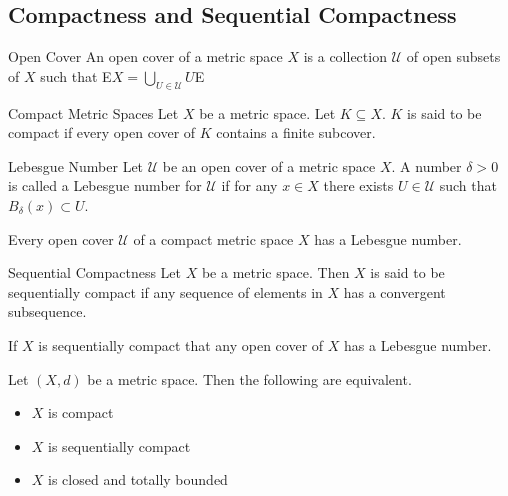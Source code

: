 \documentclass[a4paper]{article}
\begin{document}
\subsection{Compactness and Sequential Compactness}
\begin{defn}{Open Cover}{} An open cover of a metric space $X$ is a collection $\mathcal{U}$ of open subsets of $X$ such that E$X=\bigcup_{U\in\mathcal{U}}U$E
\end{defn}

\begin{defn}{Compact Metric Spaces}{} Let $X$ be a metric space. Let $K\subseteq X$. $K$ is said to be compact if every open cover of $K$ contains a finite subcover. 
\end{defn}

\begin{defn}{Lebesgue Number}{} Let $\mathcal{U}$ be an open cover of a metric space $X$. A number $\delta>0$ is called a Lebesgue number for $\mathcal{U}$ if for any $x\in X$ there exists $U\in\mathcal{U}$ such that $B_\delta(x)\subset U$. 
\end{defn}

\begin{lmm}{}{} Every open cover $\mathcal{U}$ of a compact metric space $X$ has a Lebesgue number. 
\end{lmm}

\begin{defn}{Sequential Compactness}{} Let $X$ be a metric space. Then $X$ is said to be sequentially compact if any sequence of elements in $X$ has a convergent subsequence. 
\end{defn}

\begin{lmm}{}{} If $X$ is sequentially compact that any open cover of $X$ has a Lebesgue number. 
\end{lmm}

\begin{prp}{}{} Let $(X,d)$ be a metric space. Then the following are equivalent. 
\begin{itemize}
\item $X$ is compact
\item $X$ is sequentially compact
\item $X$ is closed and totally bounded
\end{itemize}
\end{prp}
\end{document}

